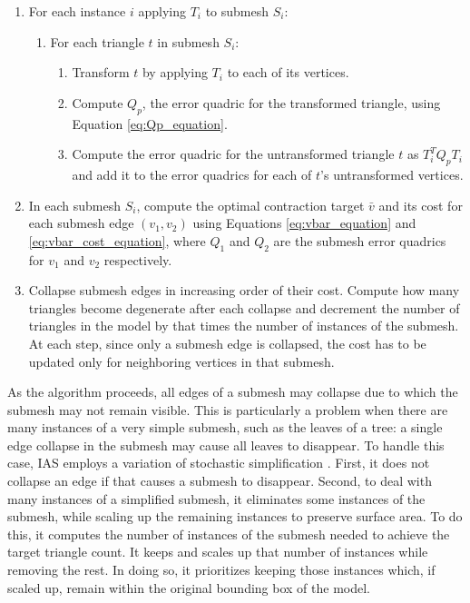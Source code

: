 \begin{enumerate}
\item For each instance $i$ applying $T_i$ to submesh $S_i$:
      \begin{enumerate}
        \item For each triangle $t$ in submesh $S_i$:
        \begin{enumerate}
        \item Transform $t$ by applying $T_i$ to each of its vertices.
        \item Compute $Q_p$, the error quadric for the transformed 
               triangle, using Equation \ref{eq:Qp_equation}.
        \item Compute the error quadric for the untransformed triangle 
               $t$ as $T_i^TQ_pT_i$
               and add it to the error quadrics for each of 
               $t$'s untransformed vertices.
        \end{enumerate}
      \end{enumerate}

    \item In each submesh $S_i$, compute the optimal
      contraction target $\bar{v}$ and its cost for each
      submesh edge $(v_1,v_2)$ using Equations
      \ref{eq:vbar_equation} and \ref{eq:vbar_cost_equation}, where
      $Q_1$ and $Q_2$ are the submesh error quadrics
      for $v_1$ and $v_2$ respectively.

    \item Collapse submesh edges in increasing order of their cost.
      Compute how many triangles become degenerate after each collapse
      and decrement the number of triangles in the model by that times
      the number of instances of the submesh.  At each step, since
      only a submesh edge is collapsed, the cost has to be updated
      only for neighboring vertices in that submesh.

\end{enumerate}

As the algorithm proceeds, all edges of a submesh may collapse due to which the
submesh may not remain visible. This is particularly a problem 
when there are many instances of a very simple submesh, such as the leaves
of a tree: a single edge collapse in the submesh may cause all
leaves to disappear. To handle this case, IAS employs a variation of 
stochastic simplification \cite{cook2007stochastic}. First, it does not collapse
an edge if that causes a submesh to disappear. Second, to deal with many instances
of a simplified submesh, it eliminates some instances of the submesh, 
while scaling up the
remaining instances to preserve surface area. To do this, it computes the number of
instances of the submesh needed to achieve the target triangle count. 
It keeps and scales up that number of instances while removing the rest.
In doing so, it prioritizes keeping those instances 
which, if scaled up, remain within the original 
bounding box of the model. 


